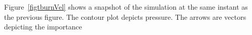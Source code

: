 Figure~\ref{figtburnVel} shows a snapshot of the simulation at the same instant as the 
previous figure.  The contour plot depicts pressure.  The arrows are vectors depicting
the importance   


%


